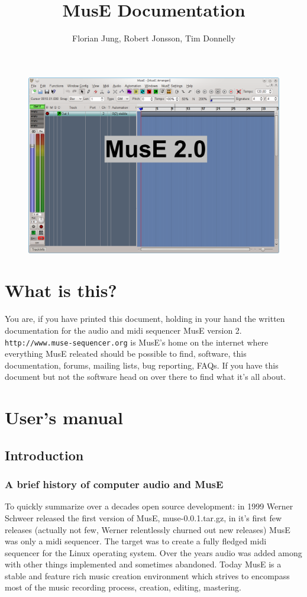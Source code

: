 \documentclass[a4paper]{report}
\author{Florian Jung, Robert Jonsson, Tim Donnelly}
\title{MusE Documentation}
\newcommand{\url}[1]{\texttt{#1}}
\begin{document}
\label{Main/Arranger}
\begin{figure}[htp]
\centering \includegraphics[width=1.0\textwidth]{pics/muse2}
\label{fig:MusE}
\end{figure}
\chapter{What is this?}
You are, if you have printed this document, holding in your hand the
written documentation for the audio and midi sequencer MusE version 2.\\ 
\url{http://www.muse-sequencer.org} is MusE's home on the internet where
everything MusE releated should be possible to find, software, this
documentation, forums, mailing lists, bug reporting, FAQs. If you have
this document but not the software head on over there to find what it's
all about.
\chapter{User's manual}

\section{Introduction}
\subsection{A brief history of computer audio and MusE}
To quickly summarize over a decades open source development: in 1999 Werner
 Schweer released the first version of MusE, muse-0.0.1.tar.gz, in it's first
few releases (actually not few, Werner relentlessly churned out new releases)
MusE was only a midi sequencer. The target was to create a fully fledged
midi sequencer for the Linux operating system. Over the years audio was
added among with other things implemented and sometimes abandoned.
Today MusE is a stable and feature rich music creation environment which
strives to encompass most of the music recording process, creation, editing,
mastering.
\end{document}
